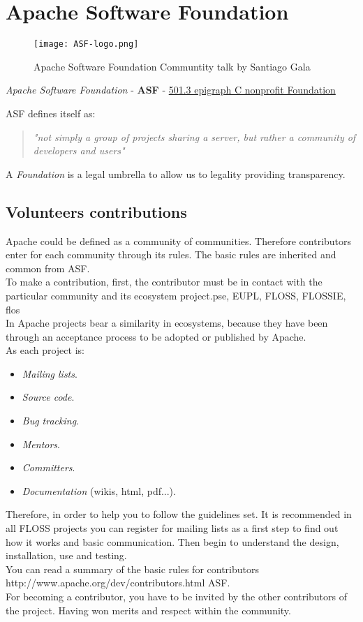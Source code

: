 \section{Apache Software Foundation}
\label{sec:asf}

\begin{figure}[H]
\centering
\texttt{[image: ASF-logo.png]}
\caption{Apache Software Foundation Communtity talk by Santiago Gala}
\label{apahce-logo}
\end{figure}

\textit{Apache Software Foundation} - \textbf{ASF} - \href{http://en.wikipedia.org/wiki/501(c)_organization#501.28c.29.283.29}{501.3 epigraph C nonprofit Foundation}

ASF defines itself as:
\begin{quotation}
    \emph{"not simply a group of projects sharing a server, but rather a community of developers and users"}
\end{quotation}

A \textit{Foundation} is a legal umbrella to allow us to legality providing transparency.

\subsection{Volunteers contributions}

\par Apache could be defined as a community of communities. Therefore contributors enter for each community through its rules. The basic rules are inherited and common from ASF.
\\ To make a contribution, first, the contributor must be in contact with the particular community and its ecosystem project.pse, EUPL, FLOSS, FLOSSIE, flos
\\ In Apache projects bear a similarity in ecosystems, because they have been through an acceptance process to be adopted or published by Apache.
\\ As each project is:
\begin{itemize}
	\item \textit{Mailing lists}.
	\item \textit{Source code}.
	\item \textit{Bug tracking}.
	\item \textit{Mentors}.
	\item \textit{Committers}.
	\item \textit{Documentation} (wikis, html, pdf...).
\end{itemize} Therefore, in order to help you to follow the guidelines set. It is recommended in all FLOSS projects you can register for mailing lists as a first step to find out how it works and basic communication. Then begin to understand the design, installation, use and testing.
\\ You can read a summary of the basic rules for contributors http://www.apache.org/dev/contributors.html ASF.
\\ For becoming a contributor, you have to be invited by the other contributors of the project. Having won merits and respect within the community.


